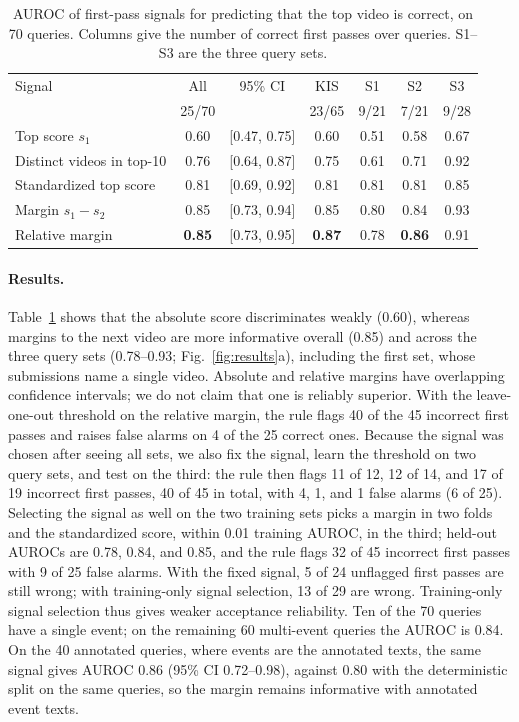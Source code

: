 \begin{table}[t]
\centering
\caption{AUROC of first-pass signals for predicting that the top video is correct, on 70 queries. Columns give the number of correct first passes over queries. S1--S3 are the three query sets.}
\label{tab:qpp}
\begin{tabular}{lcccccc}
\toprule
Signal & All & 95\% CI & KIS & S1 & S2 & S3 \\
 & 25/70 & & 23/65 & 9/21 & 7/21 & 9/28 \\
\midrule
Top score $s_1$ & 0.60 & [0.47, 0.75] & 0.60 & 0.51 & 0.58 & 0.67 \\
Distinct videos in top-10 & 0.76 & [0.64, 0.87] & 0.75 & 0.61 & 0.71 & 0.92 \\
Standardized top score & 0.81 & [0.69, 0.92] & 0.81 & 0.81 & 0.81 & 0.85 \\
Margin $s_1-s_2$ & 0.85 & [0.73, 0.94] & 0.85 & 0.80 & 0.84 & 0.93 \\
Relative margin & \textbf{0.85} & [0.73, 0.95] & \textbf{0.87} & 0.78 & \textbf{0.86} & 0.91 \\
\bottomrule
\end{tabular}
\end{table}

\paragraph{Results.}
Table~\ref{tab:qpp} shows that the absolute score discriminates weakly (0.60), whereas margins to the next video are more informative overall (0.85) and across the three query sets (0.78--0.93; Fig.~\ref{fig:results}a), including the first set, whose submissions name a single video.
Absolute and relative margins have overlapping confidence intervals; we do not claim that one is reliably superior.
With the leave-one-out threshold on the relative margin, the rule flags 40 of the 45 incorrect first passes and raises false alarms on 4 of the 25 correct ones.
Because the signal was chosen after seeing all sets, we also fix the signal, learn the threshold on two query sets, and test on the third: the rule then flags 11 of 12, 12 of 14, and 17 of 19 incorrect first passes, 40 of 45 in total, with 4, 1, and 1 false alarms (6 of 25).
Selecting the signal as well on the two training sets picks a margin in two folds and the standardized score, within 0.01 training AUROC, in the third; held-out AUROCs are 0.78, 0.84, and 0.85, and the rule flags 32 of 45 incorrect first passes with 9 of 25 false alarms.
With the fixed signal, 5 of 24 unflagged first passes are still wrong; with training-only signal selection, 13 of 29 are wrong.
Training-only signal selection thus gives weaker acceptance reliability.
Ten of the 70 queries have a single event; on the remaining 60 multi-event queries the AUROC is 0.84.
On the 40 annotated queries, where events are the annotated texts, the same signal gives AUROC 0.86 (95\% CI 0.72--0.98), against 0.80 with the deterministic split on the same queries, so the margin remains informative with annotated event texts.

